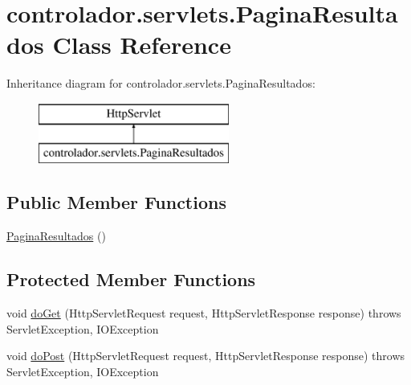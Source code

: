 \hypertarget{classcontrolador_1_1servlets_1_1PaginaResultados}{}\section{controlador.\+servlets.\+Pagina\+Resultados Class Reference}
\label{classcontrolador_1_1servlets_1_1PaginaResultados}
Inheritance diagram for controlador.\+servlets.\+Pagina\+Resultados\+:\begin{figure}[H]
\begin{center}
\leavevmode
\includegraphics[height=2.000000cm]{classcontrolador_1_1servlets_1_1PaginaResultados}
\end{center}
\end{figure}
\subsection*{Public Member Functions}
\begin{DoxyCompactItemize}
\item 
\hyperlink{classcontrolador_1_1servlets_1_1PaginaResultados_add54c1c7fc8493235606b7675f67220b}{Pagina\+Resultados} ()
\end{DoxyCompactItemize}
\subsection*{Protected Member Functions}
\begin{DoxyCompactItemize}
\item 
void \hyperlink{classcontrolador_1_1servlets_1_1PaginaResultados_ab54c05fe6b07175f62c8902d3a58f885}{do\+Get} (Http\+Servlet\+Request request, Http\+Servlet\+Response response)  throws Servlet\+Exception, I\+O\+Exception 
\item 
void \hyperlink{classcontrolador_1_1servlets_1_1PaginaResultados_ac65f808df4a17b2e3f1cc36d8b5f69cd}{do\+Post} (Http\+Servlet\+Request request, Http\+Servlet\+Response response)  throws Servlet\+Exception, I\+O\+Exception 
\end{DoxyCompactItemize}
